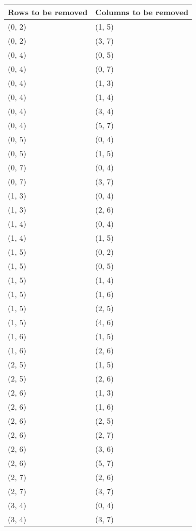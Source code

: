 \begin{footnotesize}
\begin{longtable}[c]{|l|l|}
\hline
\textbf{Rows to be removed} & \textbf{Columns to be removed} \\ \hline
\endhead
(0, 2)
&(1, 5)
\\ \hline
(0, 2)
&(3, 7)
\\ \hline
(0, 4)
&(0, 5)
\\ \hline
(0, 4)
&(0, 7)
\\ \hline
(0, 4)
&(1, 3)
\\ \hline
(0, 4)
&(1, 4)
\\ \hline
(0, 4)
&(3, 4)
\\ \hline
(0, 4)
&(5, 7)
\\ \hline
(0, 5)
&(0, 4)
\\ \hline
(0, 5)
&(1, 5)
\\ \hline
(0, 7)
&(0, 4)
\\ \hline
(0, 7)
&(3, 7)
\\ \hline
(1, 3)
&(0, 4)
\\ \hline
(1, 3)
&(2, 6)
\\ \hline
(1, 4)
&(0, 4)
\\ \hline
(1, 4)
&(1, 5)
\\ \hline
(1, 5)
&(0, 2)
\\ \hline
(1, 5)
&(0, 5)
\\ \hline
(1, 5)
&(1, 4)
\\ \hline
(1, 5)
&(1, 6)
\\ \hline
(1, 5)
&(2, 5)
\\ \hline
(1, 5)
&(4, 6)
\\ \hline
(1, 6)
&(1, 5)
\\ \hline
(1, 6)
&(2, 6)
\\ \hline
(2, 5)
&(1, 5)
\\ \hline
(2, 5)
&(2, 6)
\\ \hline
(2, 6)
&(1, 3)
\\ \hline
(2, 6)
&(1, 6)
\\ \hline
(2, 6)
&(2, 5)
\\ \hline
(2, 6)
&(2, 7)
\\ \hline
(2, 6)
&(3, 6)
\\ \hline
(2, 6)
&(5, 7)
\\ \hline
(2, 7)
&(2, 6)
\\ \hline
(2, 7)
&(3, 7)
\\ \hline
(3, 4)
&(0, 4)
\\ \hline
(3, 4)
&(3, 7)
\\ \hline

\end{longtable}
\end{footnotesize}

